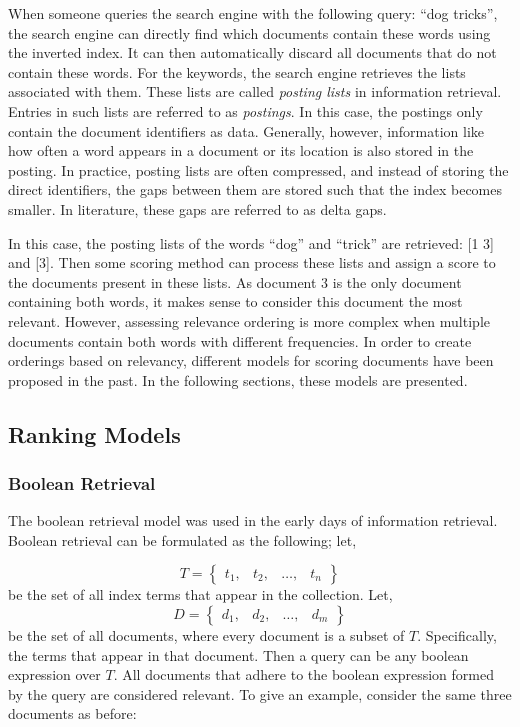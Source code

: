 When someone queries the search engine with the following query: ``dog tricks'', the search engine can directly find which documents contain these words using the inverted index. It can then automatically discard all documents that do not contain these words.
For the keywords, the search engine retrieves the lists associated with them. These lists are called \emph{posting lists} in information retrieval. Entries in such lists are referred to as \emph{postings}. In this case, the postings only contain the document identifiers as data. Generally, however, information like how often a word appears in a document or its location is also stored in the posting. In practice, posting lists are often compressed, and instead of storing the direct identifiers, the gaps between them are stored such that the index becomes smaller. In literature, these gaps are referred to as delta gaps. 

In this case, the posting lists of the words ``dog'' and ``trick'' are retrieved: [1 3] and [3]. Then some scoring method can process these lists and assign a score to the documents present in these lists. As document 3 is the only document containing both words, it makes sense to consider this document the most relevant. However, assessing relevance ordering is more complex when multiple documents contain both words with different frequencies. 
In order to create orderings based on relevancy, different models for scoring documents have been proposed in the past. In the following sections, these models are presented.

\subsection{Ranking Models}

\subsubsection{Boolean Retrieval}
The boolean retrieval model was used in the early days of information retrieval. Boolean retrieval can be formulated as the following; let, 

\begin{equation}
	T = \begin{Bmatrix}
		t_1, & t_2, & \ldots, & t_n
	\end{Bmatrix}
\end{equation}
be the set of all index terms that appear in the collection. Let,
\begin{equation}
	D = \begin{Bmatrix}
		d_1, & d_2, & \ldots, & d_m
	\end{Bmatrix}
\end{equation}
be the set of all documents, where every document is a subset of $T$. Specifically, the terms that appear in that document. Then a query can be any boolean expression over $T$. All documents that adhere to the boolean expression formed by the query are considered relevant. To give an example, consider the same three documents as before:

